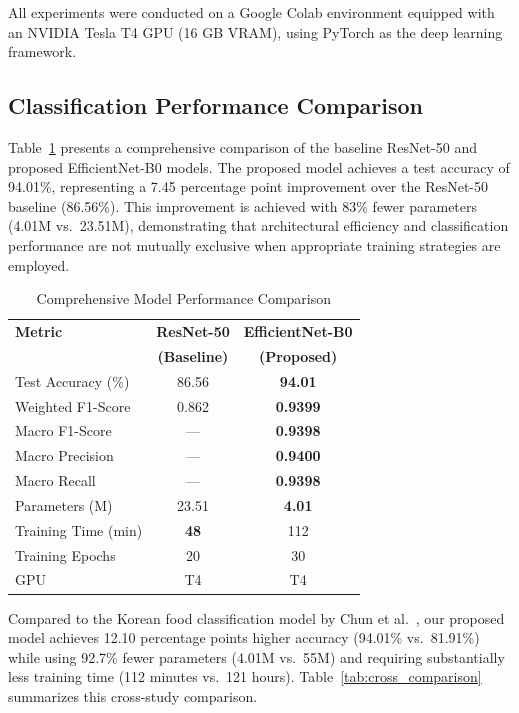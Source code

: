 \documentclass[journal]{IEEEtran}
\begin{document}
All experiments were conducted on a Google Colab environment equipped with an NVIDIA Tesla T4 GPU (16 GB VRAM), using PyTorch as the deep learning framework.

\subsection{Classification Performance Comparison}

Table~\ref{tab:model_comparison} presents a comprehensive comparison of the baseline ResNet-50 and proposed EfficientNet-B0 models. The proposed model achieves a test accuracy of 94.01\%, representing a 7.45 percentage point improvement over the ResNet-50 baseline (86.56\%). This improvement is achieved with 83\% fewer parameters (4.01M vs.\ 23.51M), demonstrating that architectural efficiency and classification performance are not mutually exclusive when appropriate training strategies are employed.

\begin{table}[!t]
\centering
\caption{Comprehensive Model Performance Comparison}
\label{tab:model_comparison}
\begin{tabular}{lcc}
\toprule
\textbf{Metric} & \textbf{ResNet-50} & \textbf{EfficientNet-B0} \\
 & \textbf{(Baseline)} & \textbf{(Proposed)} \\
\midrule
Test Accuracy (\%) & 86.56 & \textbf{94.01} \\
Weighted F1-Score & 0.862 & \textbf{0.9399} \\
Macro F1-Score & --- & \textbf{0.9398} \\
Macro Precision & --- & \textbf{0.9400} \\
Macro Recall & --- & \textbf{0.9398} \\
Parameters (M) & 23.51 & \textbf{4.01} \\
Training Time (min) & \textbf{48} & 112 \\
Training Epochs & 20 & 30 \\
GPU & T4 & T4 \\
\bottomrule
\end{tabular}
\end{table}

Compared to the Korean food classification model by Chun et al.~\cite{chun2022korean}, our proposed model achieves 12.10 percentage points higher accuracy (94.01\% vs.\ 81.91\%) while using 92.7\% fewer parameters (4.01M vs.\ 55M) and requiring substantially less training time (112 minutes vs.\ 121 hours). Table~\ref{tab:cross_comparison} summarizes this cross-study comparison.
\end{document}
